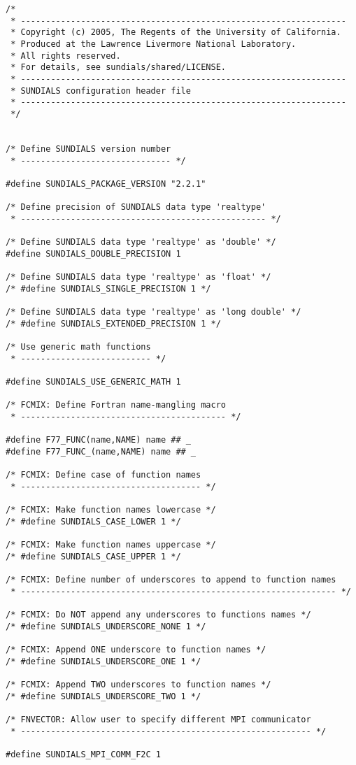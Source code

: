 \newpage
\begin{lstlisting}
/*
 * -----------------------------------------------------------------
 * Copyright (c) 2005, The Regents of the University of California.
 * Produced at the Lawrence Livermore National Laboratory.
 * All rights reserved.
 * For details, see sundials/shared/LICENSE.
 * -----------------------------------------------------------------
 * SUNDIALS configuration header file
 * -----------------------------------------------------------------
 */
 

/* Define SUNDIALS version number
 * ------------------------------ */

#define SUNDIALS_PACKAGE_VERSION "2.2.1"
 
/* Define precision of SUNDIALS data type 'realtype'
 * ------------------------------------------------- */

/* Define SUNDIALS data type 'realtype' as 'double' */
#define SUNDIALS_DOUBLE_PRECISION 1

/* Define SUNDIALS data type 'realtype' as 'float' */
/* #define SUNDIALS_SINGLE_PRECISION 1 */

/* Define SUNDIALS data type 'realtype' as 'long double' */
/* #define SUNDIALS_EXTENDED_PRECISION 1 */

/* Use generic math functions
 * -------------------------- */

#define SUNDIALS_USE_GENERIC_MATH 1
  
/* FCMIX: Define Fortran name-mangling macro
 * ----------------------------------------- */

#define F77_FUNC(name,NAME) name ## _
#define F77_FUNC_(name,NAME) name ## _

/* FCMIX: Define case of function names
 * ------------------------------------ */
 
/* FCMIX: Make function names lowercase */
/* #define SUNDIALS_CASE_LOWER 1 */

/* FCMIX: Make function names uppercase */
/* #define SUNDIALS_CASE_UPPER 1 */

/* FCMIX: Define number of underscores to append to function names
 * --------------------------------------------------------------- */

/* FCMIX: Do NOT append any underscores to functions names */
/* #define SUNDIALS_UNDERSCORE_NONE 1 */

/* FCMIX: Append ONE underscore to function names */
/* #define SUNDIALS_UNDERSCORE_ONE 1 */

/* FCMIX: Append TWO underscores to function names */
/* #define SUNDIALS_UNDERSCORE_TWO 1 */
 
/* FNVECTOR: Allow user to specify different MPI communicator
 * ---------------------------------------------------------- */

#define SUNDIALS_MPI_COMM_F2C 1

\end{lstlisting}

